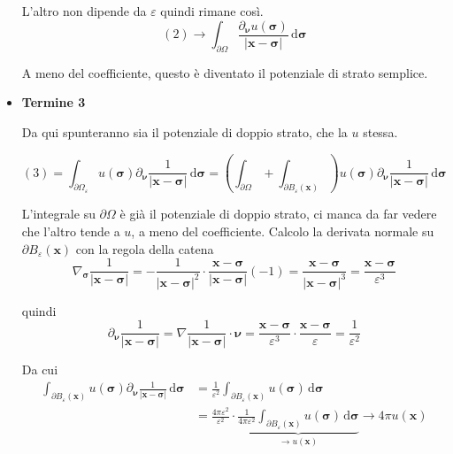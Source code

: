 \documentclass[10pt,a4paper,twoside,openright]{book}
\newcommand{\x}{\mathbf{x}}
\newcommand{\sigg}{\bm{\sigma}}
\newcommand{\nuu}{\bm{\nu}}
\newcommand{\de}{\,\mathrm d}
\newcommand{\dsig}{\de \sigg}
\begin{document}
\begin{dimostrazione}
\begin{itemize}
              L'altro non dipende da $\displaystyle \varepsilon $ quindi rimane così.
              \begin{equation*}
                  (2)\rightarrow \int _{\partial \Omega }\frac{\partial _{\nuu} u(\sigg)}{| \x -\sigg| } \dsig
              \end{equation*}

              A meno del coefficiente, questo è diventato il potenziale di strato semplice.
        \item \textbf{Termine 3}

              Da qui spunteranno sia il potenziale di doppio strato, che la $u$ stessa.

              \begin{equation*}
                  (3) =\int _{\partial \Omega _{\varepsilon }} u(\sigg) \partial _{\nuu}\frac{1}{| \x -\sigg| } \dsig =\left(\int _{\partial \Omega } +\int _{\partial B_{\varepsilon }(\x)}\right) u(\sigg) \partial _{\nuu}\frac{1}{| \x -\sigg| } \dsig
              \end{equation*}

              L'integrale su $\displaystyle \partial \Omega $ è già il potenziale di doppio strato, ci manca da far vedere che l'altro tende a $u$, a meno del coefficiente. Calcolo la derivata normale su $\displaystyle \partial B_{\varepsilon }(\x)$ con la regola della catena
              \begin{equation*}
                  \nabla _{\sigg}\frac{1}{| \x -\sigg| } =-\frac{1}{| \x -\sigg| ^{2}} \cdotp \frac{\x -\sigg}{| \x -\sigg| }(-1) =\frac{\x -\sigg}{| \x -\sigg| ^{3}} =\frac{\x -\sigg}{\varepsilon ^{3}}
              \end{equation*}

              quindi
              \begin{equation*}
                  \partial _{\nuu}\frac{1}{| \x -\sigg| } =\nabla \frac{1}{| \x -\sigg| } \cdotp \nuu =\frac{\x -\sigg}{\varepsilon ^{3}} \cdotp \frac{\x -\sigg}{\varepsilon } =\frac{1}{\varepsilon ^{2}}
              \end{equation*}

              Da cui
              \begin{align*}
                  \int _{\partial B_{\varepsilon }(\x)} u(\sigg) \partial _{\nuu}\frac{1}{| \x -\sigg| } \dsig & =\frac{1}{\varepsilon ^{2}}\int _{\partial B_{\varepsilon }(\x)} u(\sigg) \dsig                                                                                                                   \\
                                                                                                               & =\frac{4\pi \varepsilon ^{2}}{\varepsilon ^{2}} \cdotp \underbrace{\frac{1}{4\pi \varepsilon ^{2}}\int _{\partial B_{\varepsilon }(\x)} u(\sigg) \dsig}_{\rightarrow u(\x)}\rightarrow 4\pi u(\x)
              \end{align*}


\end{itemize}
\end{dimostrazione}
\end{document}

